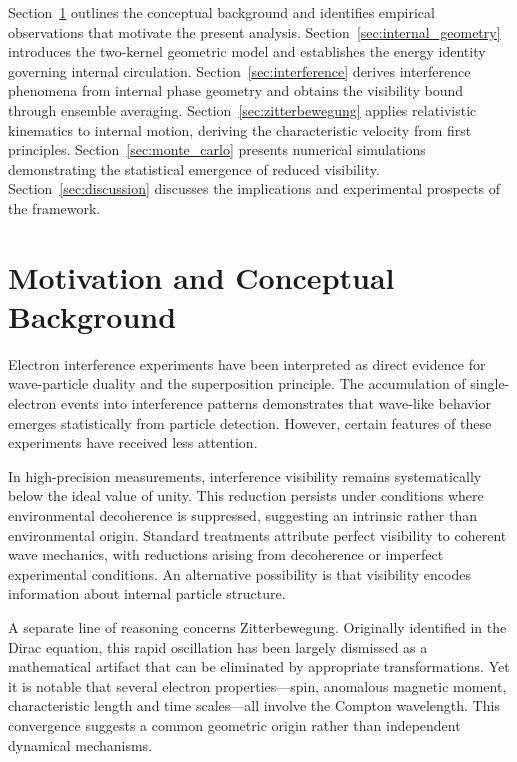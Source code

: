 \documentclass[%
 reprint,
 amsmath,amssymb,
 aps,
 prb,
]{revtex4-2}
\numberwithin{equation}{section}
\begin{document}
Section~\ref{sec:motivation} outlines the conceptual background and identifies empirical observations that motivate the present analysis. Section~\ref{sec:internal_geometry} introduces the two-kernel geometric model and establishes the energy identity governing internal circulation. Section~\ref{sec:interference} derives interference phenomena from internal phase geometry and obtains the visibility bound through ensemble averaging. Section~\ref{sec:zitterbewegung} applies relativistic kinematics to internal motion, deriving the characteristic velocity from first principles. Section~\ref{sec:monte_carlo} presents numerical simulations demonstrating the statistical emergence of reduced visibility. Section~\ref{sec:discussion} discusses the implications and experimental prospects of the framework.

\vspace{15mm}


\section{Motivation and Conceptual Background}
\label{sec:motivation}

Electron interference experiments have been interpreted as direct evidence for wave-particle duality and the superposition principle. The accumulation of single-electron events into interference patterns demonstrates that wave-like behavior emerges statistically from particle detection. However, certain features of these experiments have received less attention.

In high-precision measurements, interference visibility remains systematically below the ideal value of unity. This reduction persists under conditions where environmental decoherence is suppressed, suggesting an intrinsic rather than environmental origin. Standard treatments attribute perfect visibility to coherent wave mechanics, with reductions arising from decoherence or imperfect experimental conditions. An alternative possibility is that visibility encodes information about internal particle structure.

A separate line of reasoning concerns Zitterbewegung. Originally identified in the Dirac equation, this rapid oscillation has been largely dismissed as a mathematical artifact that can be eliminated by appropriate transformations. Yet it is notable that several electron properties---spin, anomalous magnetic moment, characteristic length and time scales---all involve the Compton wavelength. This convergence suggests a common geometric origin rather than independent dynamical mechanisms.
\end{document}

